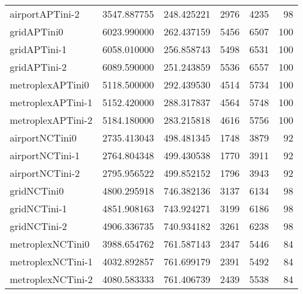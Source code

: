 \begin{table}[h]
\begin{longtable}{lrrrrr}
airportAPTini-2 & 3547.887755 & 248.425221 & 2976 & 4235 & 98 \\
gridAPTini0 & 6023.990000 & 262.437159 & 5456 & 6507 & 100 \\
gridAPTini-1 & 6058.010000 & 256.858743 & 5498 & 6531 & 100 \\
gridAPTini-2 & 6089.590000 & 251.243859 & 5536 & 6557 & 100 \\
metroplexAPTini0 & 5118.500000 & 292.439530 & 4514 & 5734 & 100 \\
metroplexAPTini-1 & 5152.420000 & 288.317837 & 4564 & 5748 & 100 \\
metroplexAPTini-2 & 5184.180000 & 283.215818 & 4616 & 5756 & 100 \\
airportNCTini0 & 2735.413043 & 498.481345 & 1748 & 3879 & 92 \\
airportNCTini-1 & 2764.804348 & 499.430538 & 1770 & 3911 & 92 \\
airportNCTini-2 & 2795.956522 & 499.852152 & 1796 & 3943 & 92 \\
gridNCTini0 & 4800.295918 & 746.382136 & 3137 & 6134 & 98 \\
gridNCTini-1 & 4851.908163 & 743.924271 & 3199 & 6186 & 98 \\
gridNCTini-2 & 4906.336735 & 740.934182 & 3261 & 6238 & 98 \\
metroplexNCTini0 & 3988.654762 & 761.587143 & 2347 & 5446 & 84 \\
metroplexNCTini-1 & 4032.892857 & 761.699179 & 2391 & 5492 & 84 \\
metroplexNCTini-2 & 4080.583333 & 761.406739 & 2439 & 5538 & 84 \\
\end{longtable}
\end{table}


